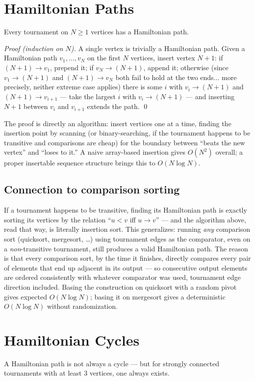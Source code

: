 \documentclass[11pt]{article}
\begin{document}
\section{Hamiltonian Paths}
\begin{theorembox}[(R\'edei)]
Every tournament on $N \ge 1$ vertices has a Hamiltonian path.

\emph{Proof (induction on $N$).} A single vertex is trivially a
Hamiltonian path. Given a Hamiltonian path $v_1, \ldots, v_N$ on the first
$N$ vertices, insert vertex $N+1$: if $(N{+}1) \to v_1$, prepend it; if
$v_N \to (N{+}1)$, append it; otherwise (since $v_1 \to (N{+}1)$ and
$(N{+}1) \to v_N$ both fail to hold at the two ends... more precisely,
neither extreme case applies) there is some $i$ with $v_i \to (N{+}1)$ and
$(N{+}1) \to v_{i+1}$ --- take the largest $i$ with $v_i \to (N{+}1)$ ---
and inserting $N{+}1$ between $v_i$ and $v_{i+1}$ extends the path. \qed
\end{theorembox}

The proof is directly an algorithm: insert vertices one at a time,
finding the insertion point by scanning (or binary-searching, if the
tournament happens to be transitive and comparisons are cheap) for the
boundary between ``beats the new vertex'' and ``loses to it.'' A naive
array-based insertion gives $O(N^2)$ overall; a proper insertable sequence
structure brings this to $O(N \log N)$.

\subsection{Connection to comparison sorting}
If a tournament happens to be transitive, finding its Hamiltonian path is
exactly sorting its vertices by the relation ``$u < v$ iff $u \to v$''
--- and the algorithm above, read that way, is literally insertion sort.
This generalizes: running \emph{any} comparison sort (quicksort,
mergesort, \ldots) using tournament edges as the comparator, even on a
\emph{non}-transitive tournament, still produces a valid Hamiltonian path.
The reason is that every comparison sort, by the time it finishes,
directly compares every pair of elements that end up adjacent in its
output --- so consecutive output elements are ordered consistently with
whatever comparator was used, tournament edge direction included. Basing
the construction on quicksort with a random pivot gives expected
$O(N \log N)$; basing it on mergesort gives a deterministic
$O(N \log N)$ without randomization.

\section{Hamiltonian Cycles}
A Hamiltonian path is not always a cycle --- but for strongly connected
tournaments with at least $3$ vertices, one always exists.
\end{document}
